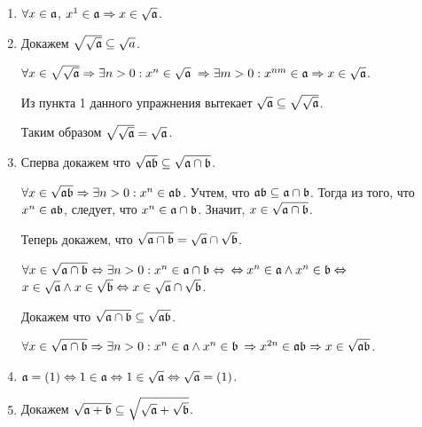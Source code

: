     \begin{Proof}
        \begin{enumerate}
            \item $\forall x \in \mathfrak{a}$, $x^1 \in \mathfrak{a} \Rightarrow x \in \sqrt{\mathfrak{a}}$.
            \item Докажем $\sqrt{\sqrt{\mathfrak{a}}} \subseteq \sqrt{a}$. 
            
            $\forall x \in \sqrt{\sqrt{\mathfrak{a}}} \Rightarrow \exists n > 0 : x^n \in \sqrt{\mathfrak{a}}$
            $\Rightarrow \exists m > 0 : x^{nm} \in \mathfrak{a} \Rightarrow x \in \sqrt{\mathfrak{a}}$.

            Из пункта 1 данного упражнения вытекает $\sqrt{\mathfrak{a}} \subseteq \sqrt{\sqrt{\mathfrak{a}}}$.

            Таким образом $\sqrt{\sqrt{\mathfrak{a}}} = \sqrt{\mathfrak{a}}$.

            \item Сперва докажем что $\sqrt{\mathfrak{ab}} \subseteq \sqrt{\mathfrak{a} \cap \mathfrak{b}}$.
            
                $\forall x \in \sqrt{\mathfrak{ab}} \Rightarrow \exists n > 0 : x^n \in \mathfrak{ab}$. Учтем, что $\mathfrak{ab} \subseteq \mathfrak{a} \cap \mathfrak{b}$.
                Тогда из того, что $x^n \in \mathfrak{ab}$, следует, что $x^n \in \mathfrak{a} \cap \mathfrak{b}$. Значит, $x \in \sqrt{\mathfrak{a} \cap \mathfrak{b}}$.

                Теперь докажем, что $\sqrt{\mathfrak{a} \cap \mathfrak{b}} = \sqrt{\mathfrak{a}} \cap \sqrt{\mathfrak{b}}$.

                $\forall x \in \sqrt{\mathfrak{a} \cap \mathfrak{b}} \Leftrightarrow \exists n > 0 :  x^n \in \mathfrak{a} \cap \mathfrak{b} \Leftrightarrow$
                \newline
                $\Leftrightarrow x^n \in \mathfrak{a} \wedge x^n \in \mathfrak{b} \Leftrightarrow$
                $x \in \sqrt{\mathfrak{a}} \wedge x \in \sqrt{\mathfrak{b}} \Leftrightarrow x \in \sqrt{\mathfrak{a}} \cap \sqrt{\mathfrak{b}}$.

                Докажем что $\sqrt{\mathfrak{a} \cap \mathfrak{b}} \subseteq \sqrt{\mathfrak{ab}}$.

                $\forall x \in \sqrt{\mathfrak{a} \cap \mathfrak{b}} \Rightarrow \exists n > 0 : x^n \in \mathfrak{a} \wedge x^n \in \mathfrak{b}$
                $\Rightarrow x^{2n} \in \mathfrak{ab} \Rightarrow x \in \sqrt{\mathfrak{ab}}$.
            
            \item $\mathfrak{a} = (1) \Leftrightarrow 1 \in \mathfrak{a} \Leftrightarrow 1 \in \sqrt{\mathfrak{a}} \Leftrightarrow \sqrt{\mathfrak{a}} = (1)$.
            \item Докажем $\sqrt{\mathfrak{a} + \mathfrak{b}} \subseteq \sqrt{\sqrt{\mathfrak{a}} + \sqrt{\mathfrak{b}}}$. 
             

\end{enumerate}
\end{Proof}
